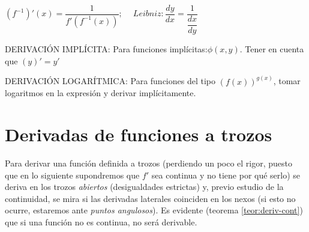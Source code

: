 	$(f^{-1})'(x)=\dfrac 1 {f'(f^{-1}(x))};\ \quad Leibniz: \dfrac {dy}{dx}=\dfrac {1}{\dfrac {dx}{dy}}$
	
	\vspace {5mm}
	
	DERIVACIÓN IMPLÍCITA:  Para funciones implícitas:$\phi(x,y)$. Tener en cuenta que $(y)'=y'$
	
	\vspace {5mm}
	
	DERIVACIÓN LOGARÍTMICA: Para funciones del tipo $(f(x))^{g(x)}$, tomar logaritmos en la expresión y derivar implícitamente.

\section{Derivadas de funciones a trozos}
	
	Para derivar una función definida a trozos (perdiendo un poco el rigor, puesto que en lo siguiente supondremos que $f'$ sea continua y no tiene por qué serlo) se deriva en los trozos \textit{abiertos} (desigualdades estrictas) y, previo estudio de la continuidad, se mira si las derivadas laterales coinciden en los nexos (si esto no ocurre, estaremos ante \textit{puntos angulosos}). Es evidente (teorema \ref{teor:deriv-cont}) que si una función no es continua, no será derivable.
	
